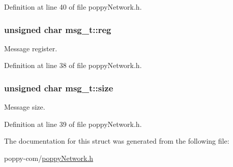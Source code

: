 \-Definition at line 40 of file poppy\-Network.\-h.

\hypertarget{structmsg__t_a0aef01fbaf575c639d82d5beee92c421}{
\subsubsection[{reg}]{\setlength{\rightskip}{0pt plus 5cm}unsigned char {\bf msg\-\_\-t\-::reg}}}\label{structmsg__t_a0aef01fbaf575c639d82d5beee92c421}
\-Message register. 

\-Definition at line 38 of file poppy\-Network.\-h.

\hypertarget{structmsg__t_a3736f2ca203e665223b225ca07def9b5}{
\subsubsection[{size}]{\setlength{\rightskip}{0pt plus 5cm}unsigned char {\bf msg\-\_\-t\-::size}}}\label{structmsg__t_a3736f2ca203e665223b225ca07def9b5}
\-Message size. 

\-Definition at line 39 of file poppy\-Network.\-h.



\-The documentation for this struct was generated from the following file\-:\begin{DoxyCompactItemize}
\item 
poppy-\/com/\hyperlink{poppy_network_8h}{poppy\-Network.\-h}\end{DoxyCompactItemize}

